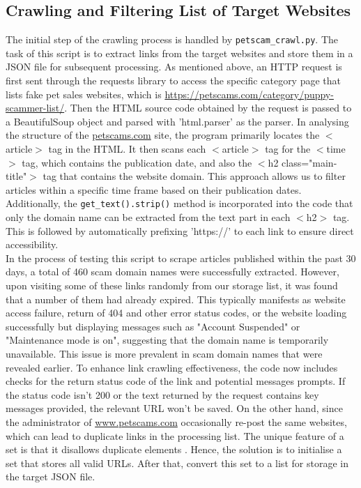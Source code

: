 \documentclass[ oneside,%
                    author={Cassie Qing Tang},
                    degree={BSc},
                     title={An Automated Response System for Disrupting Online Pet Scamming \\ },
                    subtitle={ }]{dissertation}
\begin{document}
\subsection{Crawling and Filtering List of Target Websites}
The initial step of the crawling process is handled by \texttt{petscam\_crawl.py}. The task of this script is to extract links from the target websites and store them in a JSON file for subsequent processing. As mentioned above, an HTTP request is first sent through the requests library to access the specific category page that lists fake pet sales websites, which is \url{https://petscams.com/category/puppy-scammer-list/}. Then the HTML source code obtained by the request is passed to a BeautifulSoup object and parsed with 'html.parser' as the parser. In analysing the structure of the \url{petscams.com} site, the program primarily locates the $<$article$>$ tag in the HTML. It then scans each $<$article$>$ tag for the $<$time$>$ tag, which contains the publication date, and also the $<$h2 class="main-title"$>$ tag that contains the website domain. This approach allows us to filter articles within a specific time frame based on their publication dates. Additionally, the \texttt{get\_text().strip()} method is incorporated into the code that only the domain name can be extracted from the text part in each $<$h2$>$ tag. This is followed by automatically prefixing 'https://' to each link to ensure direct accessibility.
\\

In the process of testing this script to scrape articles published within the past 30 days, a total of 460 scam domain names were successfully extracted. However, upon visiting some of these links randomly from our storage list, it was found that a number of them had already expired. This typically manifests as website access failure, return of 404 and other error status codes, or the website loading successfully but displaying messages such as "Account Suspended" or "Maintenance mode is on", suggesting that the domain name is temporarily unavailable. This issue is more prevalent in scam domain names that were revealed earlier. To enhance link crawling effectiveness, the code now includes checks for the return status code of the link and potential messages prompts. If the status code isn't 200 or the text returned by the request contains key messages provided, the relevant URL won't be saved. On the other hand, since the administrator of \url{www.petscams.com} occasionally re-post the same websites, which can lead to duplicate links in the processing list. The unique feature of a set is that it disallows duplicate elements \cite{sturtz_sets_nodate}. Hence, the solution is to initialise a set that stores all valid URLs. After that, convert this set to a list for storage in the target JSON file.
\\
\end{document}
